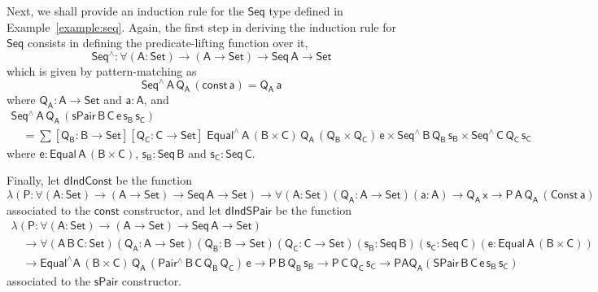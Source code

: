 \documentclass[9pt]{entcs} \usepackage{entcsmacro}
\begin{document}
Next, we shall provide an induction rule for the $\mathsf{Seq}$ type defined in Example~\ref{example:seq}.
Again, the first step in deriving the induction rule for $\mathsf{Seq}$ consists in defining the predicate-lifting function over it, 
\[
\mathsf{Seq^{\wedge} : \forall (A : Set) \to (A \to Set) \to Seq\,A \to Set}
\]
which is given by pattern-matching as
\[
\mathsf{Seq^{\wedge}\,A\,Q_A\,(const\,a) = Q_A\,a}
\]
where $\mathsf{Q_A : A \to Set}$ and $\mathsf{a : A}$,
and
\[
\begin{array}{l}
\mathsf{Seq^{\wedge}\,A\,Q_A\,(sPair\,B\,C\,e\,s_B\,s_C)} \\
\quad\mathsf{=
\sum [Q_B : B \to Set] [Q_C : C \to Set]\;
Equal^{\wedge}\,A\, (B \times C)\, Q_A\, (Q_B \times Q_C) \, e \times Seq^{\wedge}\,B\,Q_B\,s_B \times Seq^{\wedge}\,C\,Q_C\,s_C
}
\end{array}
\]
where $\mathsf{e : Equal\,A\,(B \times C)}$,
$\mathsf{s_B : Seq\,B}$ and $\mathsf{s_C : Seq\,C}$.

Finally, let $\mathsf{dIndConst}$ be the function
\[
\mathsf{
\lambda (P : \forall (A : Set) \to (A \to Set) \to Seq\,A \to Set)
\to \forall (A : Set) (Q_A : A \to Set) (a : A)
\to Q_A\,x \to P\,A\,Q_A\,(Const\,a)
}
\]
associated to the $\mathsf{const}$ constructor,
and let $\mathsf{dIndSPair}$ be the function
\[
\begin{array}{l}
\mathsf{\lambda (P : \forall (A : Set) \to (A \to Set) \to Seq\,A \to Set)} \\
\quad \mathsf{\to \forall (A\,B\,C : Set) (Q_A : A \to Set) (Q_B : B \to Set) (Q_C : C \to Set)(s_B : Seq\,B) (s_C : Seq\,C) (e : Equal\,A\,(B \times C))} \\
\quad \mathsf{\to Equal^{\wedge} A\, (B \times C)\, Q_A\, (Pair^{\wedge}\,B\,C\,Q_B\,Q_C)\, e
	\to P\,B\,Q_B\,s_B \to P\,C\,Q_C\,s_C
	\to P A Q_A ( SPair\,B\,C\,e\,s_B\,s_C )}
\end{array}
\]
associated to the $\mathsf{sPair}$ constructor.
\end{document}
